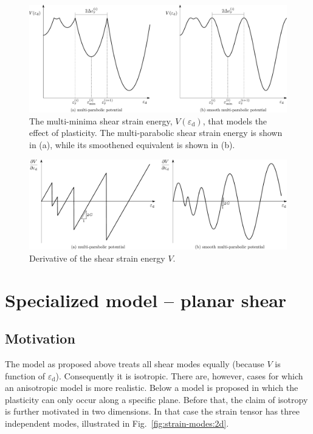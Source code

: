 \documentclass[times,namecite]{goose-article}
\begin{document}
\begin{figure}[htp]
  \centering
  \includegraphics[width=1.\textwidth]{figures/potential_V-plas}
  \caption{The multi-minima shear strain energy, $V ( \varepsilon_\mathrm{d} )$, that models the effect of plasticity. The multi-parabolic shear strain energy is shown in (a), while its smoothened equivalent is shown in (b).}
  \label{fig:V:plas}
\end{figure}

\begin{figure}[htp]
  \centering
  \includegraphics[width=1.\textwidth]{figures/potential_dV-plas}
  \caption{Derivative of the shear strain energy $V$.}
  \label{fig:dV:plas}
\end{figure}

\section{Specialized model -- planar shear}

\subsection{Motivation}

The model as proposed above treats all shear modes equally (because $V$ is function of $\varepsilon_\mathrm{d}$). Consequently it is isotropic. There are, however, cases for which an anisotropic model is more realistic. Below a model is proposed in which the plasticity can only occur along a specific plane. Before that, the claim of isotropy is further motivated in two dimensions. In that case the strain tensor has three independent modes, illustrated in Fig.~\ref{fig:strain-modes:2d}.
\end{document}
